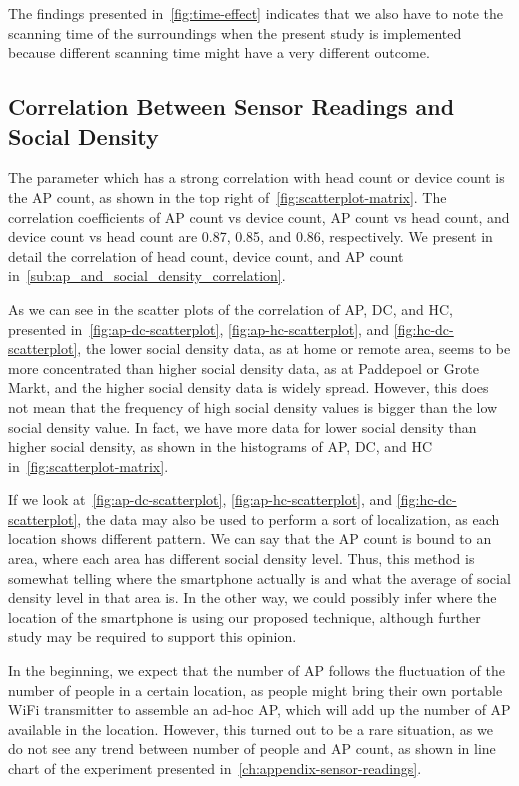 	The findings presented in~\autoref{fig:time-effect} indicates that we also have to note the scanning time of the surroundings when the present study is implemented because different scanning time might have a very different outcome.

	\subsection{Correlation Between Sensor Readings and Social Density} %
	\label{sub:correlation_between_sensor_readings_and_social_density}
	The parameter which has a strong correlation with head count or device count is the \ac{AP} count, as shown in the top right of~\autoref{fig:scatterplot-matrix}. The correlation coefficients of \ac{AP} count vs device count, \ac{AP} count vs head count, and device count vs head count are 0.87, 0.85, and 0.86, respectively. We present in detail the correlation of head count, device count, and \ac{AP} count in~\autoref{sub:ap_and_social_density_correlation}.

	As we can see in the scatter plots of the correlation of \ac{AP}, \ac{DC}, and \ac{HC}, presented in~\autoref{fig:ap-dc-scatterplot}, \autoref{fig:ap-hc-scatterplot}, and \autoref{fig:hc-dc-scatterplot}, the lower social density data, as at home or remote area, seems to be more concentrated than higher social density data, as at Paddepoel or Grote Markt, and the higher social density data is widely spread. However, this does not mean that the frequency of high social density values is bigger than the low social density value. In fact, we have more data for lower social density than higher social density, as shown in the histograms of \ac{AP}, \ac{DC}, and \ac{HC} in~\autoref{fig:scatterplot-matrix}.

	If we look at~\autoref{fig:ap-dc-scatterplot}, \autoref{fig:ap-hc-scatterplot}, and \autoref{fig:hc-dc-scatterplot}, the data may also be used to perform a sort of localization, as each location shows different pattern. We can say that the \ac{AP} count is bound to an area, where each area has different social density level. Thus, this method is somewhat telling where the smartphone actually is and what the average of social density level in that area is. In the other way, we could possibly infer where the location of the smartphone is using our proposed technique, although further study may be required to support this opinion.

	In the beginning, we expect that the number of \ac{AP} follows the fluctuation of the number of people in a certain location, as people might bring their own portable WiFi transmitter to assemble an ad-hoc \ac{AP}, which will add up the number of \ac{AP} available in the location. However, this turned out to be a rare situation, as we do not see any trend between number of people and \ac{AP} count, as shown in line chart of the experiment presented in~\autoref{ch:appendix-sensor-readings}.

